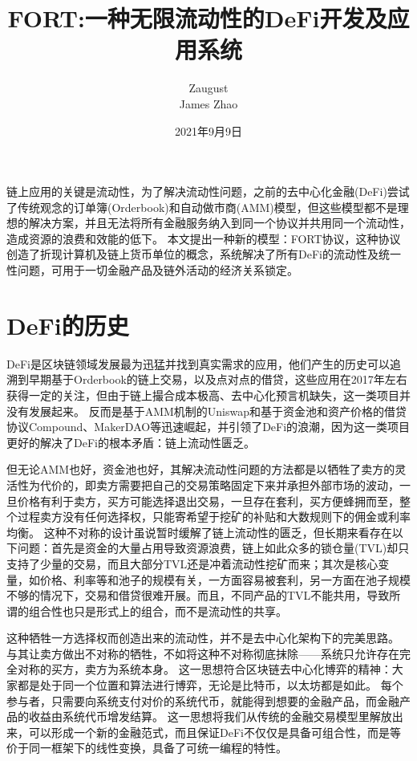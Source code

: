 \documentclass[letterpaper,11pt]{ctexart}
\begin{document}
\title{FORT:一种无限流动性的DeFi开发及应用系统}
\author{Zaugust \\ James Zhao}
\date{2021年9月9日}
\maketitle


链上应用的关键是流动性，为了解决流动性问题，之前的去中心化金融(DeFi)尝试了传统观念的订单簿(Orderbook)和自动做市商(AMM)模型，但这些模型都不是理想的解决方案，并且无法将所有金融服务纳入到同一个协议并共用同一个流动性，造成资源的浪费和效能的低下。
本文提出一种新的模型：FORT协议，这种协议创造了折现计算机及链上货币单位的概念，系统解决了所有DeFi的流动性及统一性问题，可用于一切金融产品及链外活动的经济关系锁定。

\section{DeFi的历史}

DeFi是区块链领域发展最为迅猛并找到真实需求的应用，他们产生的历史可以追溯到早期基于Orderbook的链上交易，以及点对点的借贷，这些应用在2017年左右获得一定的关注，但由于链上撮合成本极高、去中心化预言机缺失，这一类项目并没有发展起来。
反而是基于AMM机制的Uniswap和基于资金池和资产价格的借贷协议Compound、MakerDAO等迅速崛起，并引领了DeFi的浪潮，因为这一类项目更好的解决了DeFi的根本矛盾：链上流动性匮乏。

但无论AMM也好，资金池也好，其解决流动性问题的方法都是以牺牲了卖方的灵活性为代价的，即卖方需要把自己的交易策略固定下来并承担外部市场的波动，一旦价格有利于卖方，买方可能选择退出交易，一旦存在套利，买方便蜂拥而至，整个过程卖方没有任何选择权，只能寄希望于挖矿的补贴和大数规则下的佣金或利率均衡。
这种不对称的设计虽说暂时缓解了链上流动性的匮乏，但长期来看存在以下问题：首先是资金的大量占用导致资源浪费，链上如此众多的锁仓量(TVL)却只支持了少量的交易，而且大部分TVL还是冲着流动性挖矿而来；其次是核心变量，如价格、利率等和池子的规模有关，一方面容易被套利，另一方面在池子规模不够的情况下，交易和借贷很难开展。而且，不同产品的TVL不能共用，导致所谓的组合性也只是形式上的组合，而不是流动性的共享。

这种牺牲一方选择权而创造出来的流动性，并不是去中心化架构下的完美思路。
与其让卖方做出不对称的牺牲，不如将这种不对称彻底抹除——系统只允许存在完全对称的买方，卖方为系统本身。
这一思想符合区块链去中心化博弈的精神：大家都是处于同一个位置和算法进行博弈，无论是比特币，以太坊都是如此。
每个参与者，只需要向系统支付对价的系统代币，就能得到想要的金融产品，而金融产品的收益由系统代币增发结算。
这一思想将我们从传统的金融交易模型里解放出来，可以形成一个新的金融范式，而且保证DeFi不仅仅是具备可组合性，而是等价于同一框架下的线性变换，具备了可统一编程的特性。
\end{document}
